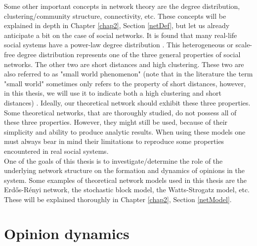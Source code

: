 \documentclass[11 pt , letterpaper , twoside , openright]{book}
\begin{document}
Some other important concepts in network theory are the degree distribution, clustering/community structure, connectivity, etc. These concepts will be explained in depth in Chapter \ref{chap2}, Section \ref{netDef}, but let us already anticipate a bit on the case of social networks. It is found that many real-life social systems have a power-law degree distribution \cite{Muchnik2013}. This heterogeneous or scale-free degree distribution represents one of the three general properties of social networks. The other two are short distances and high clustering. These two are also referred to as "small world phenomenon" (note that in the literature the term "small world" sometimes only refers to the property of short distances, however, in this thesis, we will use it to indicate both a high clustering and short distances) \cite{Muchnik2013}. Ideally, our theoretical network should exhibit these three properties. Some theoretical networks, that are thoroughly studied, do not possess all of these three properties. However, they might still be used, because of their simplicity and ability to produce analytic results. When using these models one must always bear in mind their limitations to reproduce some properties encountered in real social systems. \\
\newline
One of the goals of this thesis is to investigate/determine the role of the underlying network structure on the formation and dynamics of opinions in the system. Some examples of theoretical network models used in this thesis are the Erd\H{o}s-R\'{e}nyi network, the stochastic block model, the Watts-Strogatz model, etc. These will be explained thoroughly in Chapter \ref{chap2}, Section \ref{netModel}. 



\section{Opinion dynamics}\label{Opinion}
\end{document}
